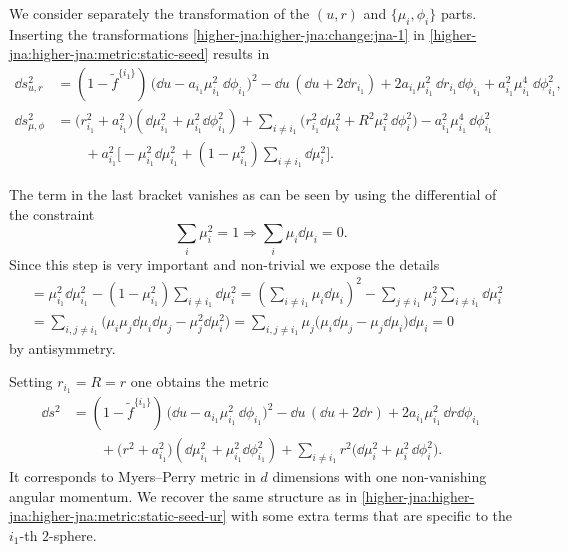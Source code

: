 We consider separately the transformation of the $(u, r)$ and $\{ \mu_i, \phi_i \}$ parts.
Inserting the transformations \eqref{higher-jna:higher-jna:change:jna-1} in \eqref{higher-jna:higher-jna:metric:static-seed} results in
\begin{subequations}
\begin{align*}
	\dd s_{u,r}^2 &= (1 - \tilde f^{\{i_1\}})\, \Big(\dd u - a_{i_1} \mu_{i_1}^2\, \dd \phi_{i_1} \Big)^2
		- \dd u\, (\dd u + 2 \dd r_{i_1})
		+ 2 a_{i_1} \mu_{i_1}^2\, \dd r_{i_1} \dd \phi_{i_1}
		+ a_{i_1}^2 \mu_{i_1}^4\, \dd \phi_{i_1}^2, \\
	\dd s_{\mu,\phi}^2 &= \big( r_{i_1}^2 + a_{i_1}^2 \big) (\dd\mu_{i_1}^2 + \mu_{i_1}^2 \dd\phi_{i_1}^2)
		+ \sum_{i \neq i_1} \big( r_{i_1}^2 \dd \mu_i^2 + R^2 \mu_i^2\, \dd \phi_i^2 \big) - a_{i_1}^2 \mu_{i_1}^4\, \dd \phi_{i_1}^2 \\
		&\qquad + a_{i_1}^2 \bigg[- \mu_{i_1}^2 \dd \mu_{i_1}^2 + (1 - \mu_{i_1}^2) \sum_{i \neq i_1} \dd \mu_i^2 \bigg].
\end{align*}
\end{subequations}

The term in the last bracket vanishes as can be seen by using the differential of the constraint
\begin{equation}
	\sum_i \mu_i^2 = 1 \Longrightarrow
	\sum_i \mu_i \dd\mu_i = 0.
\end{equation} 
Since this step is very important and non-trivial we expose the details
\begin{align*}
	[\cdots] &= \mu_{i_1}^2 \dd \mu_{i_1}^2 - (1 - \mu_{i_1}^2) \sum_{i \neq i_1} \dd \mu_i^2
		= \left(\sum_{i \neq i_1} \mu_i \dd\mu_i \right)^2 - \sum_{j \neq i_1} \mu_j^2 \sum_{i \neq i_1} \dd \mu_i^2 \\
		&= \sum_{i,j \neq i_1} \big(\mu_i \mu_j \dd\mu_i \dd\mu_j - \mu_j^2 \dd \mu_i^2 \big)
		= \sum_{i,j \neq i_1} \mu_j \big(\mu_i \dd\mu_j - \mu_j \dd \mu_i \big) \dd\mu_i
		= 0
\end{align*}
by antisymmetry.

Setting $r_{i_1} = R = r$ one obtains the metric
\begin{equation}
\begin{aligned}
	\dd s^2 &= (1 - \tilde f^{\{i_1\}})\, \Big(\dd u - a_{i_1} \mu_{i_1}^2\, \dd \phi_{i_1} \Big)^2
		- \dd u\, (\dd u + 2 \dd r)
		+ 2 a_{i_1} \mu_{i_1}^2\, \dd r \dd \phi_{i_1} \\
		&\qquad+ \big( r^2 + a_{i_1}^2 \big) (\dd\mu_{i_1}^2 + \mu_{i_1}^2 \dd\phi_{i_1}^2)
		+ \sum_{i \neq i_1} r^2 \big( \dd \mu_i^2 + \mu_i^2\, \dd \phi_i^2 \big).
\end{aligned}
\end{equation}
It corresponds to Myers--Perry metric in $d$ dimensions with one non-vanishing angular momentum.
We recover the same structure as in \eqref{higher-jna:higher-jna:higher-jna:metric:static-seed-ur} with some extra terms that are specific to the $i_1$-th $2$-sphere.


